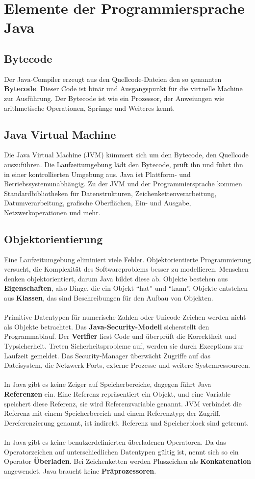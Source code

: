 \section{Elemente der Programmiersprache Java}
\subsection{Bytecode}
Der Java-Compiler erzeugt aus den Quellcode-Dateien den so genannten \textbf{Bytecode}. Dieser Code ist binär und Ausgangspunkt für die virtuelle Machine zur Ausführung. Der Bytecode ist wie ein Prozessor, der Anweiungen wie arithmetische Operationen, Sprünge und Weiteres kennt.
\subsection{Java Virtual Machine}
Die Java Virtual Machine (JVM) kümmert sich um den Bytecode, den Quellcode auszuführen. Die Laufzeitumgebung lädt den Bytecode, prüft ihn und führt ihn in einer kontrollierten Umgebung aus. Java ist Plattform- und Betriebssystemunabhängig. Zu der JVM und der Programmiersprache kommen Standardbibliotheken für Datenstrukturen, Zeichenkettenverarbeitung, Datumverarbeitung, grafische Oberflächen, Ein- und Ausgabe, Netzwerkoperationen und mehr.
\subsection{Objektorientierung}
Eine Laufzeitumgebung eliminiert viele Fehler. Objektorientierte Programmierung versucht, die Komplexität des Softwareproblems besser zu modellieren. Menschen denken objektorientiert, darum Java bildet diese ab. Objekte bestehen aus \textbf{Eigenschaften}, also Dinge, die ein Objekt ``hat'' und ``kann''. Objekte entstehen aus \textbf{Klassen}, das sind Beschreibungen für den Aufbau von Objekten.
\\\\
Primitive Datentypen für numerische Zahlen oder Unicode-Zeichen werden nicht als Objekte betrachtet. Das \textbf{Java-Security-Modell} sicherstellt den Programmablauf. Der \textbf{Verifier} liest Code und überprüft die Korrektheit und Typsicherheit. Treten Sicherheitsprobleme auf, werden sie durch Exceptions zur Laufzeit gemeldet. Das Security-Manager überwächt Zugriffe auf das Dateisystem, die Netzwerk-Ports, externe Prozesse und weitere Systemressourcen.
\\\\
In Java gibt es keine Zeiger auf Speicherbereiche, dagegen führt Java \textbf{Referenzen} ein. Eine Referenz repräsentiert ein Objekt, und eine Variable speichert diese Referenz, sie wird Referenzvariable genannt. JVM verbindet die Referenz mit einem Speicherbereich und einem Referenztyp; der Zugriff, Dereferenzierung genannt, ist indirekt. Referenz und Speicherblock sind getrennt.
\\\\
In Java gibt es keine benutzerdefinierten überladenen Operatoren. Da das Operatorzeichen auf unterschiedlichen Datentypen gültig ist, nennt sich so ein Operator \textbf{Überladen}. Bei Zeichenketten werden Pluszeichen als \textbf{Konkatenation} angewendet. Java braucht keine \textbf{Präprozessoren}.
